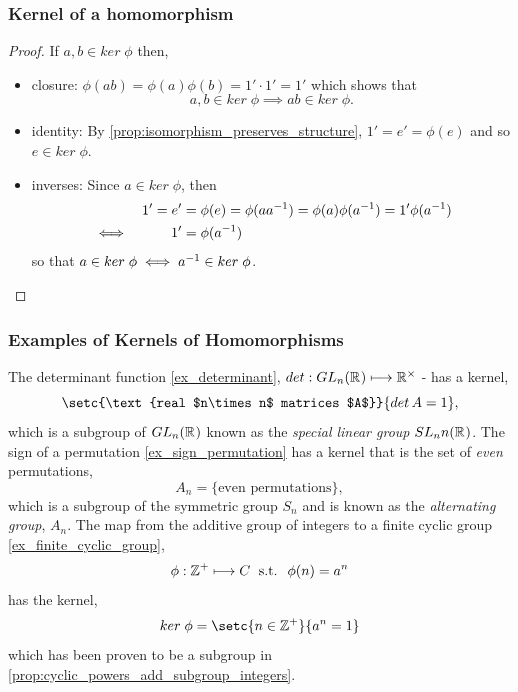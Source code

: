 \documentclass[MathsNotesBase.tex]{subfiles}
\begin{document}
{		\subsubsection{Kernel of a homomorphism}
	
		\begin{proof}
			If $a,b \in ker \; \phi$ then,
			\begin{itemize}
				\item{closure: $ \phi(ab) = \phi(a)\phi(b) = 1' \cdot 1' = 1' $ which shows that 
					\[ a,b \in ker \; \phi \implies ab \in ker \; \phi. \] }
				\item{identity: By \autoref{prop:isomorphism_preserves_structure}, $ 1' = e' = \phi(e) $ and so $e \in ker \; \phi $.}
				\item{inverses: Since $ a \in ker \; \phi $, then 
					\begin{align*}
					&&1' = e' &= \phi(e) = \phi(a{a}^{-1}) = \phi(a)\phi({a}^{-1}) = 1'\phi({a}^{-1}) \\
					&\iff &1' &= \phi({a}^{-1})
					\end{align*}
					so that $ a \in ker \; \phi \iff {a}^{-1} \in ker \; \phi $.}
			\end{itemize}
		\end{proof}
	
		\subsubsection{Examples of Kernels of Homomorphisms}
		\begin{exe}
			\ex The determinant function \ref{ex_determinant}, $ det : GL_n(\mathbb{R}^{}) \longmapsto \mathbb{R}^{\times} $ - has a kernel,
			\[ \setc{\text{real $n\times n$ matrices $A$}}{det \, A = 1}, \]
			which is a subgroup of $GL_n(\mathbb{R}^{})$ known as the \textit{special linear group} $SL_nn(\mathbb{R}^{})$.
			\label{ex_special_lin_group}
			\ex The sign of a permutation \ref{ex_sign_permutation} has a kernel that is the set of \textit{even} permutations,
			\[ A_n = \{\text{even permutations}\}, \]
			which is a subgroup of the symmetric group $S_n$ and is known as the \textit{alternating group}, $A_n$.
			\label{ex_alternating_group}
			\ex The map from the additive group of integers to a finite cyclic group \ref{ex_finite_cyclic_group},
			\[ \phi : \mathbb{Z}^{+} \longmapsto C \; \text{ s.t. } \; \phi(n) = a^n \]
			has the kernel,
			\[ ker \; \phi = \setc{n \in \Z{+}}{a^n = 1} \]
			which has been proven to be a subgroup in \autoref{prop:cyclic_powers_add_subgroup_integers}.
			\label{ex_kernel_cyclic_powers}
		\end{exe}
	
}
\end{document}
